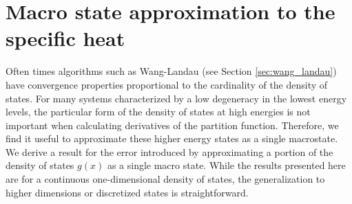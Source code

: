\chapter{Macro state approximation to the specific heat}
\label{chap:macrostate_approx}

Often times algorithms such as Wang-Landau (see Section \ref{sec:wang_landau}) have convergence properties proportional to the cardinality of the density of states. For many systems characterized by a low degeneracy in the lowest energy levels, the particular form of the density of states at high energies is not important when calculating derivatives of the partition function. Therefore, we find it useful to approximate these higher energy states as a single macrostate. We derive a result for the error introduced by approximating a portion of the density of states $g(x)$ as a single macro state. While the results presented here are for a continuous one-dimensional density of states, the generalization to higher dimensions or discretized states is straightforward. 

